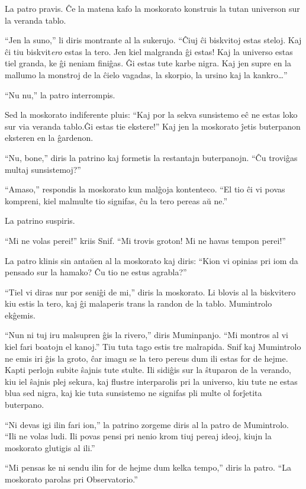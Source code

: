 La patro pravis. Ĉe la matena kafo la moskorato konstruis la tutan universon sur la veranda tablo.

``Jen la suno,'' li diris montrante al la sukerujo. ``Ĉiuj ĉi biskvitoj estas steloj. Kaj ĉi tiu biskvit\emph{ero} estas la tero. Jen kiel malgranda ĝi estas! Kaj la universo estas tiel granda, ke ĝi neniam finiĝas. Ĝi estas tute karbe nigra. Kaj jen supre en la mallumo la monstroj de la ĉielo vagadas, la skorpio, la ursino kaj la kankro{\ldots}''

``Nu nu,'' la patro interrompis.

Sed la moskorato indiferente pluis: ``Kaj por la sekva sunsistemo eĉ ne estas loko sur via veranda tablo.Ĝi estas tie ekstere!'' Kaj jen la moskorato ĵetis buterpanon eksteren en la ĝardenon.

``Nu, bone,'' diris la patrino kaj formetis la restantajn buterpanojn. ``Ĉu troviĝas multaj sunsistemoj?''

``Amaso,'' respondis la moskorato kun malĝoja kontenteco. ``El tio ĉi vi povas kompreni, kiel malmulte tio signifas, ĉu la tero pereas aŭ ne.''

La patrino suspiris.

``Mi ne volas perei!'' kriis Snif. ``Mi trovis groton! Mi ne havas tempon perei!''

La patro klinis sin antaŭen al la moskorato kaj diris: ``Kion vi opinias pri iom da pensado sur la hamako? Ĉu tio ne estus agrabla?''

``Tiel vi diras nur por seniĝi de mi,'' diris la moskorato. Li blovis al la biskvitero kiu estis la tero, kaj ĝi malaperis trans la randon de la tablo. Mumintrolo ekĝemis.

``Nun ni tuj iru malsupren ĝis la rivero,'' diris Muminpanjo. ``Mi montros al vi kiel fari boatojn el kanoj.''
\sectionbreak
Tiu tuta tago estis tre malrapida. Snif kaj Mumintrolo ne emis iri ĝis la groto, ĉar imagu se la tero pereus dum ili estas for de hejme. Kapti perlojn subite ŝajnis tute stulte. Ili sidiĝis sur la ŝtuparon de la verando, kiu iel ŝajnis plej sekura, kaj flustre interparolis pri la universo, kiu tute ne estas blua sed nigra, kaj kie tuta sunsistemo ne signifas pli multe ol forĵetita buterpano.

``Ni devas igi ilin fari ion,'' la patrino zorgeme diris al la patro de Mumintrolo. ``Ili ne volas ludi. Ili povas pensi pri nenio krom tiuj pereaj ideoj, kiujn la moskorato glutigis al ili.''

``Mi pensas ke ni sendu ilin for de hejme dum kelka tempo,'' diris la patro. ``La moskorato parolas pri Observatorio.''

